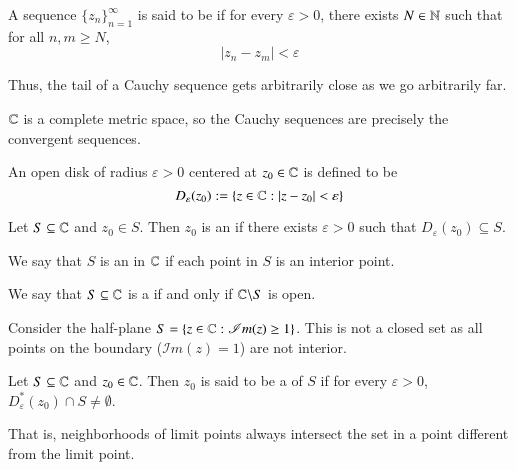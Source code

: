 \begin{definition}
    A sequence $\{z_n\}_{n=1}^{\infty}$ is said to be  if for every $\varepsilon > 0$, there exists $N \in \mathbb N$ such that for all $n,m \geq N$, \begin{equation*}
        |z_n - z_m| < \varepsilon
    \end{equation*}
\end{definition}

Thus, the tail of a Cauchy sequence gets arbitrarily close as we go arbitrarily far.

$\mathbb C$ is a complete metric space, so the Cauchy sequences are precisely the convergent sequences.


\begin{definition}
    An open disk of radius $\varepsilon > 0$ centered at $z_0 \in \mathbb C$ is defined to be \begin{equation*}
        D_{\varepsilon}(z_0) := \{z \in \mathbb C: |z-z_0| < \varepsilon\}
    \end{equation*}
\end{definition}

\begin{definition}
    Let $S \subseteq \mathbb C$ and $z_0 \in S$. Then $z_0$ is an  if there exists $\varepsilon > 0$ such that $D_{\varepsilon}(z_0) \subseteq S$. 

    We say that $S$ is an  in $\mathbb C$ if each point in $S$ is an interior point.
\end{definition}

\begin{definition}
    We say that $S \subseteq \mathbb C$ is a  if and only if $\mathbb C\backslash S$ is open.
\end{definition}

\begin{example}
    Consider the half-plane $S = \{z \in \mathbb C: \mathscr{I}m(z) \geq 1\}$. This is not a closed set as all points on the boundary ($\mathscr{I}m(z) = 1$) are not interior.
\end{example}

\begin{definition}
    Let $S \subseteq \mathbb C$ and $z_0 \in \mathbb C$. Then $z_0$ is said to be a  of $S$ if for every $\varepsilon > 0$, $D_{\varepsilon}^*(z_0)\cap S \neq \emptyset$. 
\end{definition}
That is, neighborhoods of limit points always intersect the set in a point different from the limit point.

